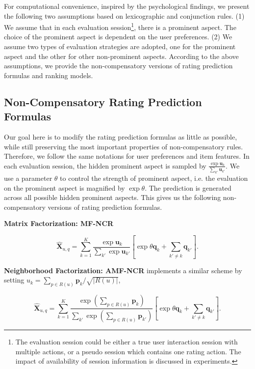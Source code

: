 \documentclass[letterpaper]{article} %
\begin{document}
For computational convenience, inspired by the psychological findings, we present the following two assumptions based on lexicographic and conjunction rules. (1) We assume that in each evaluation session\footnote{The evaluation session could be either a true user interaction session with multiple actions, or a pseudo session which contains one rating action. The impact of availability of session information is discussed in experiments. }, there is a prominent aspect. The choice of the prominent aspect is dependent on the user preferences. (2) We assume two types of evaluation strategies are adopted, one for the prominent aspect and the other for other non-prominent aspects. According to the above assumptions, we provide the non-compensatory versions of rating prediction formulas and ranking models.

 
\subsection{Non-Compensatory Rating Prediction Formulas}
Our goal here is to modify the rating prediction formulas as little as possible, while still preserving the most important properties of non-compensatory rules. Therefore, we follow the same notations for user preferences and item features. In each evaluation session, the hidden prominent aspect is sampled by $\frac{\exp \mathbf{u}_k}{\sum_{k'} \mathbf{u}_{k'}} $. We use a parameter $\theta$ to control the strength of prominent aspect, i.e. the evaluation on the prominent aspect is magnified by  $\exp \theta$. The prediction is generated across all possible hidden prominent aspects. This gives us the following non-compensatory versions of rating prediction formulas.

\textbf{Matrix Factorization: MF-NCR} 

\begin{equation}\label{equ:MF-NCR}
 \hat{\mathbf{X}}_{u,q}=\sum_{k=1}^{K} \frac{\exp \mathbf{u}_k}{\sum_{k'} \exp \mathbf{u}_{k'}} [ \exp\theta \mathbf{q}_k  + \sum_{k'\neq k} \mathbf{q}_{k'} ].
\end{equation}


\textbf{Neighborhood Factorization: AMF-NCR} implements a similar scheme by setting $u_k =\sum_{p \in R(u)} \mathbf{p}_k/\sqrt{|R(u)|} $, 

\begin{equation}\label{equ:AMF-NCR}
 \hat{\mathbf{X}}_{u,q}=\sum_{k=1}^{K} \frac{\exp (\sum_{p \in R(u)} \mathbf{p}_k )}{\sum_{k'} \exp  (\sum_{p \in R(u)} \mathbf{p}_{k'} ) } [ \exp\theta \mathbf{q}_k  + \sum_{k'\neq k} \mathbf{q}_{k'} ].
\end{equation}
\end{document}
